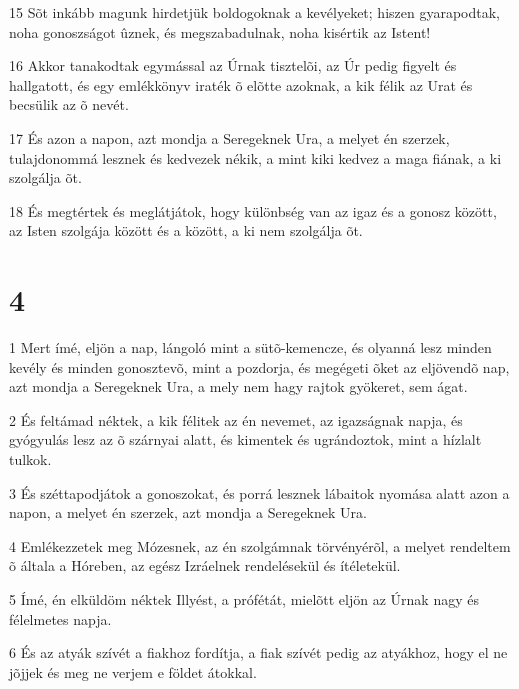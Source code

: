 \par 15 Sõt inkább magunk hirdetjük boldogoknak a kevélyeket; hiszen gyarapodtak, noha gonoszságot ûznek, és megszabadulnak, noha kisértik az Istent!
\par 16 Akkor tanakodtak egymással az Úrnak tisztelõi, az Úr pedig figyelt és hallgatott, és egy emlékkönyv iraték õ elõtte azoknak, a kik félik az Urat és becsülik az õ nevét.
\par 17 És azon a napon, azt mondja a Seregeknek Ura, a melyet én szerzek, tulajdonommá lesznek és kedvezek nékik, a mint kiki kedvez a maga fiának, a ki szolgálja õt.
\par 18 És megtértek és meglátjátok, hogy különbség van az igaz és a gonosz között, az Isten szolgája között és a között, a ki nem szolgálja õt.

\chapter{4}

\par 1 Mert ímé, eljön a nap, lángoló mint a sütõ-kemencze, és olyanná lesz minden kevély és minden gonosztevõ, mint a pozdorja, és megégeti õket az eljövendõ nap, azt mondja a Seregeknek Ura, a mely nem hagy rajtok gyökeret, sem ágat.
\par 2 És feltámad néktek, a kik félitek az én nevemet, az igazságnak napja, és gyógyulás lesz az õ szárnyai alatt, és kimentek és ugrándoztok, mint a hízlalt tulkok.
\par 3 És széttapodjátok a gonoszokat, és porrá lesznek lábaitok nyomása alatt azon a napon, a melyet én szerzek, azt mondja a Seregeknek Ura.
\par 4 Emlékezzetek meg Mózesnek, az én szolgámnak törvényérõl, a melyet rendeltem õ általa a Hóreben, az egész Izráelnek rendelésekül és ítéletekül.
\par 5 Ímé, én elküldöm néktek Illyést, a prófétát, mielõtt eljön az Úrnak nagy és félelmetes napja.
\par 6 És az atyák szívét a fiakhoz fordítja, a fiak szívét pedig az atyákhoz, hogy el ne jõjjek és meg ne verjem e földet átokkal.


